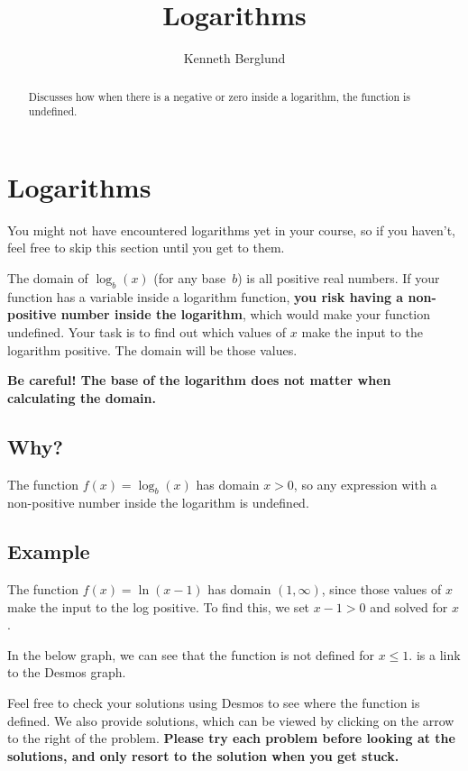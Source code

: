 \documentclass{ximera}
\title{ Logarithms}
\author{Kenneth Berglund}
\begin{document}
\begin{abstract}
Discusses how when there is a negative or zero inside a logarithm, the function is undefined. 
\end{abstract}
\maketitle

\section{Logarithms}
You might not have encountered logarithms yet in your course, so if you haven’t, feel free to skip this section until you get to them.

The domain of $\log_b(x)$ (for any base $b$) is all positive real numbers. If your function has a variable inside a logarithm function, \textbf{you risk having a non-positive number inside the logarithm}, which would make your function undefined. Your task is to find out which values of $x$ make the input to the logarithm positive. The domain will be those values.

\textbf{Be careful! The base of the logarithm does not matter when calculating the domain.}

\subsection{Why?}
The function $f(x) = \log_b(x)$ has domain $x > 0$, so any expression with a non-positive number inside the logarithm is undefined. 

\subsection{Example}
The function $f(x) = \ln(x - 1)$ has domain $(1, \infty)$, since those values of $x$ make the input to the log positive. To find this, we set $x - 1 > 0$ and solved for $x$.

In the below graph, we can see that the function is not defined for $x \le 1$.  is a link to the Desmos graph. 
\begin{center}
\end{center}

Feel free to check your solutions using Desmos to see where the function is defined. We also provide solutions, which can be viewed by clicking on the arrow to the right of the problem. \textbf{Please try each problem before looking at the solutions, and only resort to the solution when you get stuck.} 
\end{document}

